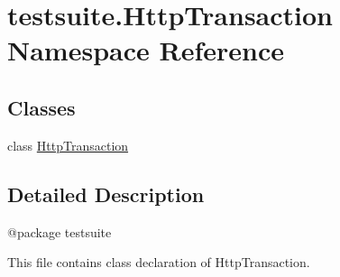 \hypertarget{namespacetestsuite_1_1HttpTransaction}{}\section{testsuite.\+Http\+Transaction Namespace Reference}
\label{namespacetestsuite_1_1HttpTransaction}
\subsection*{Classes}
\begin{DoxyCompactItemize}
\item 
class \hyperlink{classtestsuite_1_1HttpTransaction_1_1HttpTransaction}{Http\+Transaction}
\end{DoxyCompactItemize}


\subsection{Detailed Description}
\begin{DoxyVerb}@package testsuite

This file contains class declaration of HttpTransaction.
\end{DoxyVerb}
 